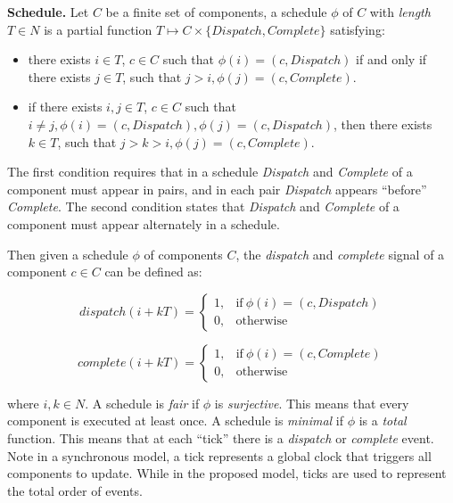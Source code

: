 {\bf Schedule.}
Let $C$ be a finite set of components, a schedule $\phi$ of $C$ with \emph{length} $T\in N$ is a partial function $T \mapsto C\times \{Dispatch, Complete\}$ satisfying:
\begin{itemize}
	\item there exists $i\in T$, $c\in C$ such that $\phi(i) = (c, Dispatch)$ if and only if there exists $j\in T$, such that $j > i, \phi(j) =  (c, Complete)$.
	\item if there exists $i, j\in T$, $c\in C$ such that $i \neq j, \phi(i) = (c, Dispatch), \phi(j) = (c, Dispatch)$, then there exists $k\in T$, such that $j >k> i, \phi(j) =  (c, Complete)$.
\end{itemize}
The first condition requires that in a schedule \emph{Dispatch} and \emph{Complete} of a component must appear in pairs, and in each pair \emph{Dispatch} appears ``before'' \emph{Complete}. The second condition states that \emph{Dispatch} and \emph{Complete} of a component must appear alternately in a schedule. 

Then given a schedule $\phi$ of components $C$, the \emph{dispatch} and \emph{complete} signal of a component $c \in C$ can be defined as:
  
\begin{equation}
\label{eqn:dispatch}
    dispatch(i+kT) =
    \begin{cases}
      1, & \text{if}\ \phi(i) = (c, Dispatch) \\
      0, & \text{otherwise}
    \end{cases}
\end{equation}

\begin{equation}
\label{eqn:complete}
    complete(i+kT) =
    \begin{cases}
      1, & \text{if}\ \phi(i) = (c, Complete) \\
      0, & \text{otherwise}
    \end{cases}
\end{equation}

where $i,k\in N$.
A schedule is \emph{fair} if $\phi$ is \emph{surjective}. This means that every component is executed at least once.
A schedule is \emph{minimal} if $\phi$ is a \emph{total} function. This means that at each ``tick'' there is a \emph{dispatch} or \emph{complete} event. Note in a synchronous model, a tick represents a global clock that triggers all components to update. While in the proposed model, ticks are used to represent the total order of events. 

